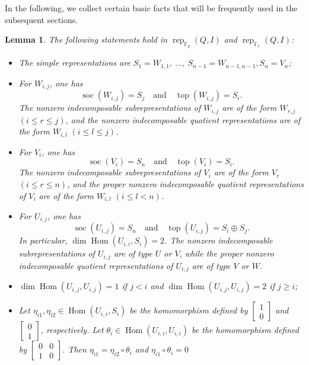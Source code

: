 \documentclass[12pt]{amsart}
\newtheorem{lemma}[theorem]{Lemma}
\theoremstyle{remark}
\theoremstyle{definition}
\numberwithin{equation}{section}
\newcommand{\Hom}{\operatorname{Hom}\nolimits}
\begin{document}
In the following, we collect certain basic facts that will be frequently used in the subsequent sections.
\begin{lemma}\label{lem:basic-hom-space-gentle-one}
The following statements hold in $\operatorname{rep}_{\mathbb{F}_q}(Q,I)$ and $\operatorname{rep}_{\mathbb{F}_1}(Q,I)$:
    \begin{itemize}
        \item[(1)]  The simple representations are $S_1=W_{1,1},\ \ldots,\ S_{n-1}=W_{n-1,n-1}, S_n=V_n$;


\item[(2)]  For $W_{i,j}$, one has
\[
\operatorname{soc}(W_{i,j}) = S_j \quad \text{and}\quad \operatorname{top}(W_{i,j})=S_i.
\]
The nonzero indecomposable subrepresentations of $W_{i,j}$  are of the form $W_{r,j}$ $(i\le r\le j)$,
and the nonzero indecomposable quotient representations are of the form
$W_{i,l}$ $(i\le l\le j)$.

\item[(3)] For $V_i$, one has
\[
\operatorname{soc}(V_i) = S_n  \quad \text{and}\quad \operatorname{top} (V_i)=S_i.
\]
The nonzero indecomposable subrepresentations of $V_i$ are of the form $V_r$ $(i\leq r\leq n)$,
and the proper nonzero indecomposable quotient representations of $V_i$ are of the form
$W_{i,l}$ $(i\leq l <n)$.

\item[(4)]  For $U_{i,j}$, one has
\[
\operatorname{soc}(U_{i,j}) = S_n\quad \text{and}\quad \operatorname{top}(U_{i,j})=S_i\oplus S_j.
\]
In particular, $\dim \Hom(U_{i,i},S_i)=2$.
The nonzero indecomposable subrepresentations of $U_{i,j}$ are of type $U$ or $V$,
while the proper nonzero indecomposable quotient representations of $U_{i,j}$ are of type $V$ or $W$.
        

        \item[(5)] $\dim \Hom(U_{i,j},U_{i,j})=1$ if $j<i$ and $\dim\Hom(U_{i,j},U_{i,j})=2$ if $j\geq i$;
        \item[(6)] Let $\eta_{i1},\eta_{i2}\in \Hom(U_{i,i},S_i)$ be the homomorphism defined by $\begin{bmatrix}
            1\\0
        \end{bmatrix}$ and $\begin{bmatrix}
            0\\1
        \end{bmatrix}$, respectively. Let $\theta_i\in \Hom(U_{i,i},U_{i,i})$ be the homomorphism defined by $\begin{bmatrix}
            0&0\\1&0
        \end{bmatrix}$. Then $\eta_{i1}=\eta_{i2}\circ \theta_i$ and $\eta_{i1}\circ \theta_i=0$
    \end{itemize}
\end{lemma}
\end{document}
